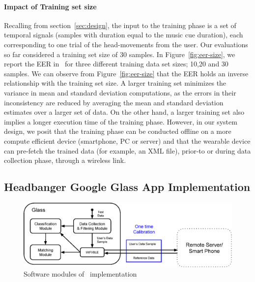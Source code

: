 \paragraph{Impact of Training set size}
Recalling from \systemname section~\ref{sec:design}, the input to the training phase
is a set of temporal signals (samples with duration equal to the music cue 
duration), each corresponding to one trial of the head-movements from the 
user. Our evaluations so far considered a training set size of 30 samples. 
In Figure~\ref{fig:eer-size}, we report the EER in \systemname~for three 
different training data set sizes; 10,20 and 30 samples.
We can observe from Figure~\ref{fig:eer-size} that the EER holds an inverse 
relationship with the training set size. A larger training set minimizes the 
variance in mean and standard deviation computations, as the errors in their 
inconsistency are reduced by averaging the mean and standard deviation 
estimates over a larger set of data. 
On the other hand, a larger training set also implies a longer execution time 
of the training phase.
However, in our system design, we posit that the training phase can be 
conducted 
offline on a more compute efficient device (smartphone, PC or server) and that 
the wearable device can pre-fetch the trained data (for example, an XML file), 
prior-to or during data collection phase, through a wireless link.


\subsection{Headbanger Google Glass App Implementation}

\begin{figure}[t]
\centering
\includegraphics [width=\columnwidth]{figure/software_arch.eps}
\caption{Software modules of \systemname~implementation}
\vspace{25 pt}
\label{fig:glass-softwarearch}
\end{figure}

